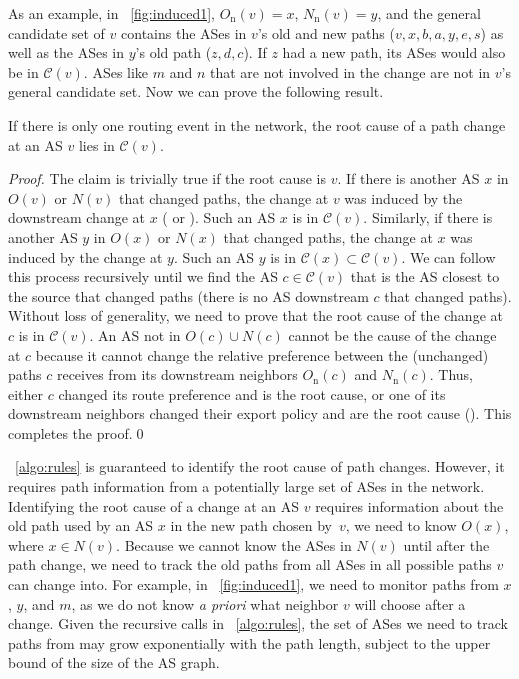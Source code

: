 As an example, in \fig~\ref{fig:induced1}, $O_{\mathrm{n}}(v) = x$,
$N_{\mathrm{n}}(v) = y$, and the general candidate set of $v$ contains
the ASes in $v$'s old and new paths ($v, x, b, a, y, e, s$) as well as
the ASes in $y$'s old path ($z, d, c$). If $z$ had a new path, its ASes
would also be in $\mathcal{C}(v)$.  ASes like $m$ and $n$ that are not
involved in the change are not in $v$'s general candidate set.  Now we can
prove the following result. 

\begin{theorem}
If there is only one routing event in the network, the root cause of a path
change at an AS $v$ lies in $\mathcal{C}(v)$.
\label{thm:correctness}
\end{theorem}

\begin{proof}  The claim is trivially true if the root cause is $v$. If
there is another AS $x$ in $O(v)$ or $N(v)$ that changed paths, the
change at $v$ was induced by the downstream change at $x$ (\neighborC{}
or \downstreamC{}).  Such an AS $x$ is in $\mathcal{C}(v)$.  Similarly,
if there is another AS $y$ in $O(x)$ or $N(x)$ that changed paths, the
change at $x$ was induced by the change at $y$.  Such an AS $y$ is in
$\mathcal{C}(x) \subset \mathcal{C}(v)$.  We can follow this process
recursively until we find the AS $c \in \mathcal{C}(v)$ that is the AS
closest to the source that changed paths (\ie there is no AS downstream
$c$ that changed paths).  Without loss of generality, we need to prove
that the root cause of the change at $c$ is in $\mathcal{C}(v)$. An AS
not in $O(c) \cup N(c)$ cannot be the cause of the change at $c$ because
it cannot change the relative preference between the (unchanged) paths
$c$ receives from its downstream neighbors $O_\mathrm{n}(c)$ and
$N_\mathrm{n}(c)$.  Thus, either $c$ changed its route preference and is
the root cause, or one of its downstream neighbors changed their export
policy and are the root cause (\localC{}).  This
completes the proof.\hfill\qed \end{proof}

\algstr~\ref{algo:rules} is guaranteed to identify the root cause of path
changes. However, it requires path information from a potentially large set of
ASes in the network.  Identifying the root cause of a change at an AS
$v$ requires information about the old path used by an AS $x$ in the new
path chosen by~$v$, \ie we need to know $O(x)$, where $x \in N(v)$.
Because we cannot know the ASes in $N(v)$ until after the path change,
we need to track the old paths from all ASes in all possible paths $v$
can change into.  For example, in \fig~\ref{fig:induced1}, we need to
monitor paths from $x$, $y$, and $m$, as we do not know {\em a priori} what neighbor
$v$ will choose after a change.  Given the recursive calls in
\algstr~\ref{algo:rules}, the set of ASes we need to track paths from may
grow exponentially with the path length, subject to the upper bound of
the size of the AS graph.

